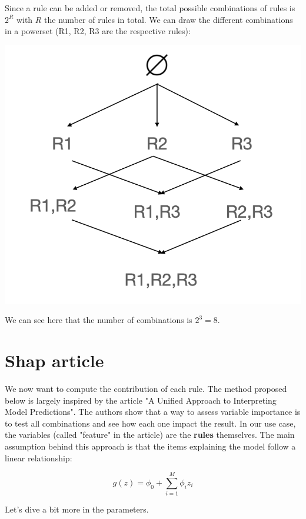 Since a rule can be added or removed, the total possible combinations of rules is $2^R$ with $R$ the number of rules in total. We can draw the different combinations in a powerset (R1, R2, R3 are the respective rules):

\begin{center}
\includegraphics[scale=0.6]{powerset.png}
\end{center}

We can see here that the number of combinations is $2^3 = 8$. \\

\section{Shap article}

\label{sec:shap-article}

We now want to compute the contribution of each rule. The method proposed below is largely inspired by the article "A Unified Approach to Interpreting Model Predictions". The authors show that a way to assess variable importance is to test all combinations and see how each one impact the result. In our use case, the variables (called "feature" in the article) are the \textbf{rules} themselves. The main assumption behind this approach is that the items explaining the model follow a linear relationship:

$$g(z) = \phi_0 + \sum_{i=1}^M \phi_i z_i$$

Let's dive a bit more in the parameters. \\

